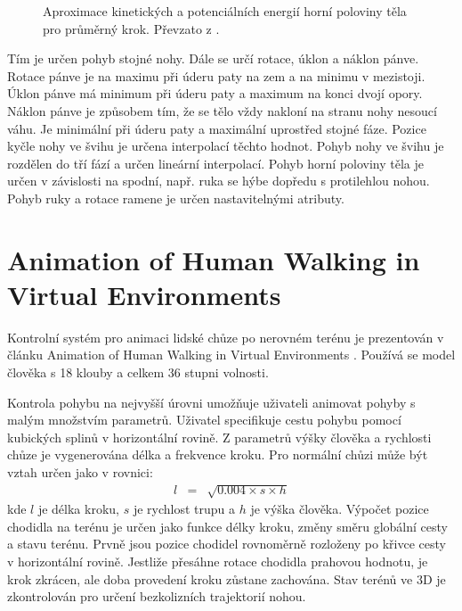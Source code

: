 \begin{figure}[h]
\begin{center}
\caption{Aproximace kinetických a potenciálních energií horní poloviny těla pro průměrný krok. Převzato z \cite{bruderlin}.} \label{bruderlin_img}
\end{center}
\end{figure}

Tím je určen pohyb stojné nohy. Dále se určí rotace, úklon a náklon pánve. Rotace pánve je na maximu při úderu paty na zem a na minimu v mezistoji. Úklon pánve má minimum při úderu paty a maximum na konci dvojí opory. Náklon pánve je způsobem tím, že se tělo vždy nakloní na stranu nohy nesoucí váhu. Je minimální při úderu paty a maximální uprostřed stojné fáze. Pozice kyčle nohy ve švihu je určena interpolací těchto hodnot. Pohyb nohy ve švihu je rozdělen do tří fází a určen lineární interpolací. Pohyb horní poloviny těla je určen v závislosti na spodní, např. ruka se hýbe dopředu s protilehlou nohou. Pohyb ruky a rotace ramene je určen nastavitelnými atributy.

\section{Animation of Human Walking in Virtual Environments}
Kontrolní systém pro animaci lidské chůze po nerovném terénu je prezentován v článku Animation of Human Walking in Virtual Environments \cite{chung}. Používá se model člověka s 18 klouby a celkem 36 stupni volnosti. 

Kontrola pohybu na nejvyšší úrovni umožňuje uživateli animovat pohyby s malým množstvím parametrů. Uživatel specifikuje cestu pohybu pomocí kubických splinů v horizontální rovině. Z parametrů výšky člověka a rychlosti chůze je vygenerována délka a frekvence kroku. Pro normální chůzi může být vztah určen jako v rovnici:
\begin{eqnarray}
l &=& \sqrt{0.004 \times s \times h}\label{r.step_length}
\end{eqnarray}
kde $l$ je délka kroku, $s$ je rychlost trupu a $h$ je výška člověka.
Výpočet pozice chodidla na terénu je určen jako funkce délky kroku, změny směru globální cesty a stavu terénu. Prvně jsou pozice chodidel rovnoměrně rozloženy po křivce cesty v horizontální rovině. Jestliže přesáhne rotace chodidla prahovou hodnotu, je krok zkrácen, ale doba provedení kroku zůstane zachována. Stav terénů ve 3D je zkontrolován pro určení bezkolizních trajektorií nohou. 

